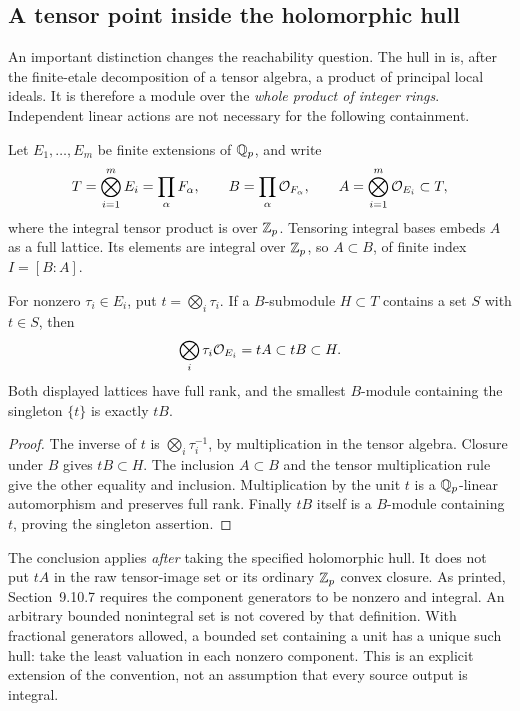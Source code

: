 \subsection{A tensor point inside the holomorphic hull}\label{sec:holomorphic-hull}
An important distinction changes the reachability question. The hull in
\cite[Section~9.10.7, p.~125]{JoshiIII} is, after the finite-etale
decomposition of a tensor algebra, a product of principal local ideals.
It is therefore a module over the \emph{whole product of integer rings}.
Independent linear actions are not necessary for the following containment.

Let $E_1,\ldots,E_m$ be finite extensions of $\mathbb Q_p$, and write
\[
 T=\bigotimes_{i=1}^m E_i=\prod_\alpha F_\alpha,\qquad
 B=\prod_\alpha\mathcal O_{F_\alpha},\qquad
 A=\bigotimes_{i=1}^m\mathcal O_{E_i}\subset T,
\]
where the integral tensor product is over $\mathbb Z_p$.
Tensoring integral bases embeds $A$ as a full lattice. Its elements are
integral over $\mathbb Z_p$, so $A\subset B$, of finite index $I=[B:A]$.

\begin{proposition}\label{prop:point-hull}
For nonzero $\tau_i\in E_i$, put $t=\bigotimes_i\tau_i$. If a
$B$-submodule $H\subset T$ contains a set $S$ with $t\in S$, then
\[
 \bigotimes_i\tau_i\mathcal O_{E_i}=tA\subset tB\subset H.
\]
Both displayed lattices have full rank, and the smallest $B$-module
containing the singleton $\{t\}$ is exactly $tB$.
\end{proposition}
\begin{proof}
The inverse of $t$ is $\bigotimes_i\tau_i^{-1}$, by multiplication in
the tensor algebra. Closure under $B$ gives $tB\subset H$.
The inclusion $A\subset B$ and the tensor multiplication rule give
the other equality and inclusion. Multiplication by the unit $t$ is a
$\mathbb Q_p$-linear automorphism and preserves full rank. Finally $tB$ itself
is a $B$-module containing $t$, proving the singleton assertion.
\end{proof}

The conclusion applies \emph{after} taking the specified holomorphic hull.
It does not put $tA$ in the raw tensor-image set or its ordinary
$\mathbb Z_p$ convex closure. As printed, Section~9.10.7 requires the component
generators to be nonzero and integral. An arbitrary bounded nonintegral
set is not covered by that definition. With fractional generators allowed,
a bounded set containing a unit has a unique such hull: take the least
valuation in each nonzero component. This is an explicit extension of
the convention, not an assumption that every source output is integral.

